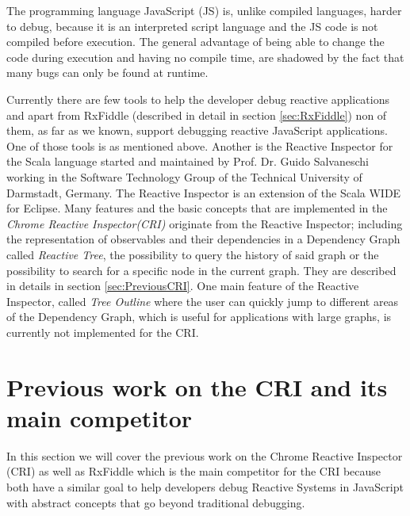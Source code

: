 
The programming language JavaScript (JS) is, unlike compiled languages, harder to debug, because it is an interpreted script language and the JS code is not compiled before execution. The general advantage of being able to change the code during execution and having no compile time, are shadowed by the fact that many bugs can only be found at runtime. 


Currently there are few tools to help the developer debug reactive applications and apart from RxFiddle (described in detail in section \ref{sec:RxFiddle}) non of them, as far as we known, support debugging reactive JavaScript applications. One of those tools is \cite{ShinyGraphFromLog} as mentioned above. Another is the Reactive Inspector for the Scala language \cite{ReactiveInspector} started and maintained by Prof. Dr. Guido Salvaneschi working in the Software Technology Group of the Technical University of Darmstadt, Germany.
The Reactive Inspector is an extension of the Scala WIDE for Eclipse. Many features and the basic concepts that are implemented in the \emph{Chrome Reactive Inspector(CRI)} originate from the Reactive Inspector; including the representation of observables and their dependencies in a Dependency Graph called \emph{Reactive Tree}, the possibility to query the history of said %
 graph or the possibility to search for a specific node in the current graph. They are described in details in section \ref{sec:PreviousCRI}. One main feature of the Reactive Inspector, called \emph{Tree Outline} where the user can quickly jump to different areas of the Dependency Graph, which is useful for applications with large graphs, is currently not implemented for the CRI.

\section{Previous work on the CRI and its main competitor}
In this section we will cover the previous work on the Chrome Reactive Inspector (CRI) as well as RxFiddle which is the main competitor for the CRI because both have a similar goal to help developers debug Reactive Systems in JavaScript with abstract concepts that go beyond traditional debugging.

